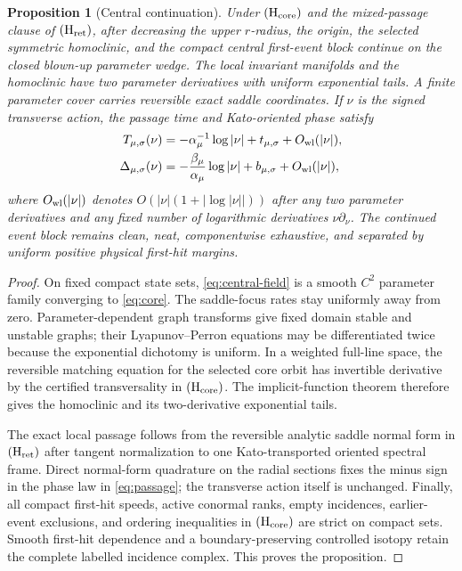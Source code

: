\documentclass[11pt,reqno]{amsart}
\numberwithin{equation}{section}
\newtheorem{proposition}[theorem]{Proposition}
\theoremstyle{definition}
\theoremstyle{remark}
\begin{document}
\begin{proposition}[Central continuation]\label{prop:central}
Under ${\rm(H_{core})}$ and the mixed-passage clause of
${\rm(H_{ret})}$, after decreasing the upper $r$-radius, the origin,
the selected symmetric homoclinic, and the compact central first-event block
continue on the closed blown-up parameter wedge.  The local invariant
manifolds and the homoclinic have two parameter derivatives with uniform
exponential tails.  A finite parameter cover carries reversible exact saddle
coordinates.  If $\nu$ is the signed transverse action, the passage time and
Kato-oriented phase satisfy
\begin{equation}\label{eq:passage}
 \begin{aligned}
  T_{\mu,\sigma}(\nu)
   &=-\alpha_\mu^{-1}\log|\nu|+t_{\mu,\sigma}
      +O_{\rm wl}(|\nu|),\\
  \Delta_{\mu,\sigma}(\nu)
   &=-\frac{\beta_\mu}{\alpha_\mu}\log|\nu|
      +b_{\mu,\sigma}+O_{\rm wl}(|\nu|),
 \end{aligned}
\end{equation}
where $O_{\rm wl}(|\nu|)$ denotes
$O(|\nu|(1+|\log|\nu||))$ after any two parameter derivatives and any fixed
number of logarithmic derivatives $\nu\partial_\nu$.  The continued event
block remains clean, neat, componentwise exhaustive, and separated by
uniform positive physical first-hit margins.
\end{proposition}

\begin{proof}
On fixed compact state sets, \eqref{eq:central-field} is a smooth $C^2$
parameter family converging to \eqref{eq:core}.  The saddle-focus rates stay
uniformly away from zero.  Parameter-dependent graph transforms give fixed
domain stable and unstable graphs; their Lyapunov--Perron equations may be
differentiated twice because the exponential dichotomy is uniform.  In a
weighted full-line space, the reversible matching equation for the selected
core orbit has invertible derivative by the certified transversality in
${\rm(H_{core})}$.  The implicit-function theorem therefore gives the
homoclinic and its two-derivative exponential tails.

The exact local passage follows from the reversible analytic saddle normal
form in ${\rm(H_{ret})}$ after tangent normalization to one Kato-transported
oriented spectral frame.  Direct normal-form quadrature on the radial
sections fixes the minus sign in the phase law in \eqref{eq:passage}; the
transverse action itself is unchanged.  Finally, all compact first-hit
speeds, active conormal ranks, empty incidences, earlier-event exclusions,
and ordering inequalities in ${\rm(H_{core})}$ are strict on compact sets.
Smooth first-hit dependence and a boundary-preserving controlled isotopy
retain the complete labelled incidence complex.  This proves the proposition.
\end{proof}
\end{document}
